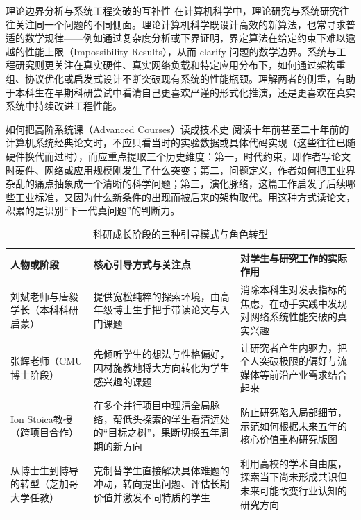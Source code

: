 \documentclass[UTF8,a4paper,11pt,fontset=fandol]{ctexart}
\begin{document}
\begin{knowledgebox}{理论边界分析与系统工程突破的互补性}
在计算机科学中，理论研究与系统研究往往关注同一个问题的不同侧面。理论计算机科学既设计高效的新算法，也常寻求普适的数学规律——例如通过复杂度分析或下界证明，界定算法在给定约束下难以逾越的性能上限（Impossibility Results），从而 clarify 问题的数学边界。系统与工程研究则更关注在真实硬件、真实网络负载和特定应用分布下，如何通过架构重组、协议优化或启发式设计不断突破现有系统的性能瓶颈。理解两者的侧重，有助于本科生在早期科研尝试中看清自己更喜欢严谨的形式化推演，还是更喜欢在真实系统中持续改进工程性能。
\end{knowledgebox}
\begin{importantbox}{如何把高阶系统课（Advanced Courses）读成技术史}
阅读十年前甚至二十年前的计算机系统经典论文时，不应只看当时的实验数据或具体代码实现（这些往往已随硬件换代而过时），而应重点提取三个历史维度：第一，时代约束，即作者写论文时硬件、网络或应用规模刚发生了什么突变；第二，问题定义，作者如何把工业界杂乱的痛点抽象成一个清晰的科学问题；第三，演化脉络，这篇工作启发了后续哪些工业标准，又因为什么新条件的出现而被后来的架构取代。用这种方式读论文，积累的是识别“下一代真问题”的判断力。
\end{importantbox}
\begin{table}[H]\centering\small
\caption{科研成长阶段的三种引导模式与角色转型}
\begin{tabular}{>{\raggedright\arraybackslash}p{\dimexpr(\linewidth-6\tabcolsep)/3\relax}>{\raggedright\arraybackslash}p{\dimexpr(\linewidth-6\tabcolsep)/3\relax}>{\raggedright\arraybackslash}p{\dimexpr(\linewidth-6\tabcolsep)/3\relax}}
\toprule
人物或阶段 & 核心引导方式与关注点 & 对学生与研究工作的实际作用\\\midrule
刘斌老师与唐毅学长（本科科研启蒙） & 提供宽松纯粹的探索环境，由高年级博士生手把手带读论文与入门课题 & 消除本科生对发表指标的焦虑，在动手实践中发现对网络系统性能突破的真实兴趣\\[4pt]
张辉老师（CMU博士阶段） & 先倾听学生的想法与性格偏好，因材施教地将大方向转化为学生感兴趣的课题 & 让研究者产生内驱力，把个人突破极限的偏好与流媒体等前沿产业需求结合起来\\[4pt]
Ion Stoica教授（跨项目合作） & 在多个并行项目中理清全局脉络，帮低头探索的学生看清远处的“目标之树”，果断切换五年周期的新方向 & 防止研究陷入局部细节，示范如何根据未来五年的核心价值重构研究版图\\[4pt]
从博士生到博导的转型（芝加哥大学任教） & 克制替学生直接解决具体难题的冲动，转向提出问题、评估长期价值并激发不同特质的学生 & 利用高校的学术自由度，探索当下尚未形成共识但未来可能改变行业认知的研究方向\\[4pt]
\bottomrule\end{tabular}\end{table}
\end{document}
